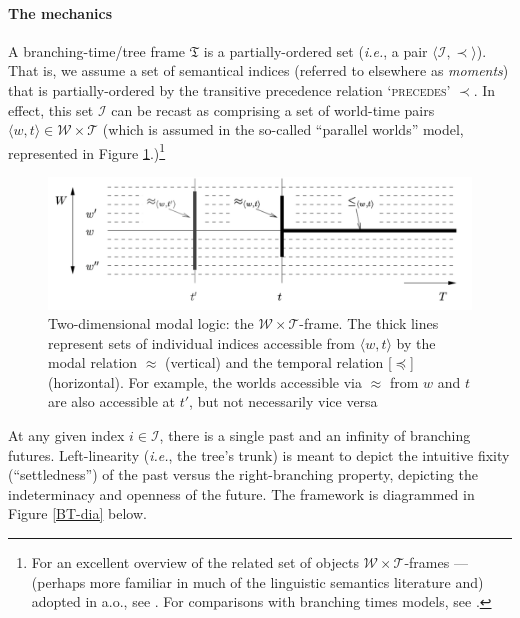 \documentclass[11pt,dvipsnames]{report}
\begin{document}
\paragraph{The mechanics} A branching-time/tree frame $ \mathfrak T$ is a partially-ordered set (\textit{i.e.}, a pair $\langle \mathcal{I,\prec}\rangle $). That is, we assume a set of semantical indices (referred to elsewhere as \textit{moments}) that is partially-ordered by the transitive precedence relation \textsc{`precedes'} $ \boldsymbol\prec $. In effect, this set $ \mathcal I $ can be recast as comprising a set of world-time pairs $ \langle w,t\rangle\in\mathcal{W\times T} $ (which is assumed in the so-called ``parallel worlds'' model, represented in Figure \ref{KCH-WTframe}.)\footnote{For an excellent overview of the related set of objects $ \mathcal{W\times T} $-frames --- (perhaps more familiar in much of the linguistic semantics literature and) adopted in \citet{Kaufmann2005,Condoravdi2002,Klecha2016a} a.o., see \citet*{Kaufmann2006}. For comparisons with branching times models, see \citealt{Thomason1970,Thomason1984,Rumberg2016}.}


\begin{figure}
	\centering	\caption[$ \mathcal{W\times T}: $Two dimensional modal logic: the Parallel Worlds model]{Two-dimensional modal logic: the $ \mathcal{W\times T} $-frame. The thick lines represent sets of individual indices accessible from $ \langle w,t\rangle $ by the modal relation $ \approx $ (vertical) and the temporal relation [$ \preccurlyeq $] (horizontal). For example, the worlds accessible via $ \approx $ from $ w $ and $ t $ are also accessible at $ t' $, but not necessarily vice versa \citep*[diagram and caption from][95]{Kaufmann2006}}	\label{KCH-WTframe}
	\includegraphics[width=0.8\linewidth]{KCH06-95-WTframe}
	
\end{figure}



At any given index $ i\in\mathcal I $, there is a single past and an infinity of branching futures. Left-linearity (\textit{i.e.}, the tree's trunk) is meant to depict the intuitive fixity (``settledness'') of the past versus the right-branching property, depicting the indeterminacy and openness of the future.
The framework is diagrammed in Figure \ref{BT-dia} below.
\end{document}
